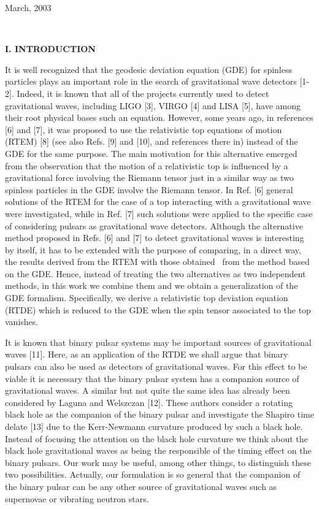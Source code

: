 \documentclass[a4paper,12pt]{article}
\begin{document}
March, 2003

\newpage\ 

\noindent \textbf{I. INTRODUCTION}

\bigskip

It is well recognized that the geodesic deviation equation (GDE) for
spinless particles plays an important role in the search of gravitational
wave detectors [1-2]. Indeed, it is known that all of the projects currently
used to detect gravitational waves, including LIGO [3], VIRGO [4] and LISA
[5], have among their root physical bases such an equation. However, some
years ago, in references [6] and [7], it was proposed to use the
relativistic top equations of motion (RTEM) [8] (see also Refs. [9] and
[10], and references there in) instead of the GDE for the same purpose. The
main motivation for this alternative emerged from the observation that the
motion of a relativistic top is influenced by a gravitational force
involving the Riemann tensor just in a similar way as two spinless particles
in the GDE involve the Riemann tensor. In Ref. [6] general solutions of the
RTEM for the case of a top interacting with a gravitational wave were
investigated, while in Ref. [7] such solutions were applied to the specific
case of considering pulsars as gravitational wave detectors. Although the
alternative method proposed in Refs. [6] and [7] to detect gravitational
waves is interesting by itself, it has to be extended with the purpose of
comparing, in a direct way, the results derived from the RTEM with those
obtained \ from the method based on the GDE. Hence, instead of treating the
two alternatives as two independent methods, in this work we combine them
and we obtain a generalization of the GDE formalism. Specifically, we derive
a relativistic top deviation equation (RTDE) which is reduced to the GDE
when the spin tensor associated to the top vanishes.

It is known that binary pulsar systems may be important sources of
gravitational waves [11]. Here, as an application of the RTDE we shall argue
that binary pulsars can also be used as detectors of gravitational waves.
For this effect to be viable it is necessary that the binary pulsar system
has a companion source of gravitational waves. A similar but not quite the
same idea has already been considered by Laguna and Welszczan [12]. These
authors consider a rotating black hole as the companion of the binary pulsar
and investigate the Shapiro time delate [13] due to the Kerr-Newmann
curvature produced by such a black hole. Instead of focusing the attention
on the black hole curvature we think about the black hole gravitational
waves as being the responsible of the timing effect on the binary pulsars.
Our work may be useful, among other things, to distinguish these two
possibilities. Actually, our formulation is so general that the companion of
the binary pulsar can be any other source of gravitational waves such as
supernovae or vibrating neutron stars.
\end{document}
